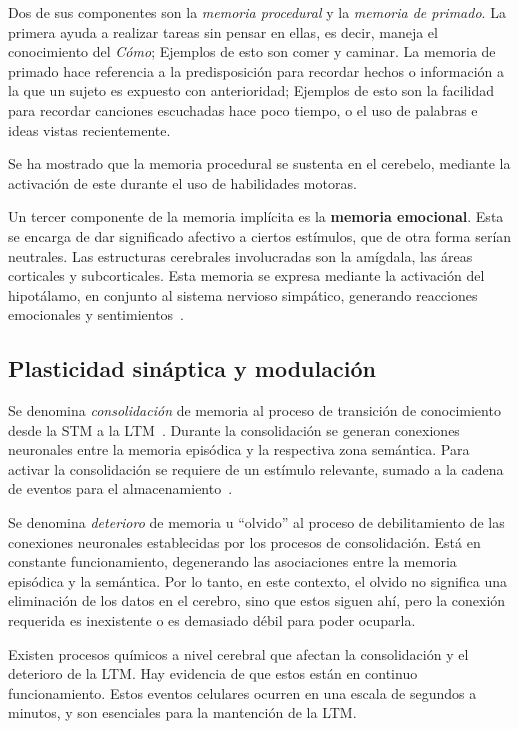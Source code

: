 Dos de sus componentes son la \textit{memoria procedural} y la \textit{memoria de primado}. La primera ayuda a realizar tareas sin pensar en ellas, es decir, maneja el conocimiento del \textit{Cómo}; Ejemplos de esto son comer y caminar. La memoria de primado hace referencia a la predisposición para recordar hechos o información a la que un sujeto es expuesto con anterioridad; Ejemplos de esto son la facilidad para recordar canciones escuchadas hace poco tiempo, o el uso de palabras e ideas vistas recientemente.

Se ha mostrado que la memoria procedural se sustenta en el cerebelo, mediante la activación de este durante el uso de habilidades motoras.

Un tercer componente de la memoria implícita es la \textbf{memoria emocional}. Esta se encarga de dar significado afectivo a ciertos estímulos, que de otra forma serían neutrales. Las estructuras cerebrales involucradas son la amígdala, las áreas corticales y subcorticales. Esta memoria se expresa mediante la activación del hipotálamo, en conjunto al sistema nervioso simpático, generando reacciones emocionales y sentimientos~\cite{episodic_philip}.


\subsection{Plasticidad sináptica y modulación}

Se denomina \textit{consolidación} de memoria al proceso de transición de conocimiento desde la STM a la LTM~\cite{Bailey13445}. Durante la consolidación se generan conexiones neuronales entre la memoria episódica y la respectiva zona semántica. Para activar la consolidación se requiere de un estímulo relevante, sumado a la cadena de eventos para el almacenamiento~\cite{Eichenbaum:2008}.

Se denomina \textit{deterioro} de memoria u ``olvido'' al proceso de debilitamiento de las conexiones neuronales establecidas por los procesos de consolidación. Está en constante funcionamiento, degenerando las asociaciones entre la memoria episódica y la semántica. Por lo tanto, en este contexto, el olvido no significa una eliminación de los datos en el cerebro, sino que estos siguen ahí, pero la conexión requerida es inexistente o es demasiado débil para poder ocuparla.

Existen procesos químicos a nivel cerebral que afectan la consolidación y el deterioro de la LTM. Hay evidencia de que estos están en continuo funcionamiento. Estos eventos celulares ocurren en una escala de segundos a minutos, y son esenciales para la mantención de la LTM.


